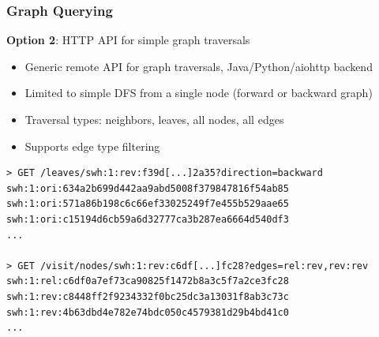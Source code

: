 \documentclass[aspectratio=169,xcolor=table]{beamer}
\begin{document}
    \begin{frame}[fragile]
        \frametitle{Graph Querying}

        \begin{block}{}
            \textbf{Option 2}: HTTP API for simple graph traversals

            \begin{itemize}
                \item Generic remote API for graph traversals, Java/Python/aiohttp backend
                \item Limited to simple DFS from a single node (forward or
                    backward graph)
                \item Traversal types: neighbors, leaves, all nodes, all edges
                \item Supports edge type filtering
            \end{itemize}
        \end{block}

        \begin{verbatim}
> GET /leaves/swh:1:rev:f39d[...]2a35?direction=backward
swh:1:ori:634a2b699d442aa9abd5008f379847816f54ab85
swh:1:ori:571a86b198c6c66ef33025249f7e455b529aae65
swh:1:ori:c15194d6cb59a6d32777ca3b287ea6664d540df3
...

> GET /visit/nodes/swh:1:rev:c6df[...]fc28?edges=rel:rev,rev:rev
swh:1:rel:c6df0a7ef73ca90825f1472b8a3c5f7a2ce3fc28
swh:1:rev:c8448ff2f9234332f0bc25dc3a13031f8ab3c73c
swh:1:rev:4b63dbd4e782e74bdc050c4579381d29b4bd41c0
...
        \end{verbatim}
    \end{frame}


\end{document}

